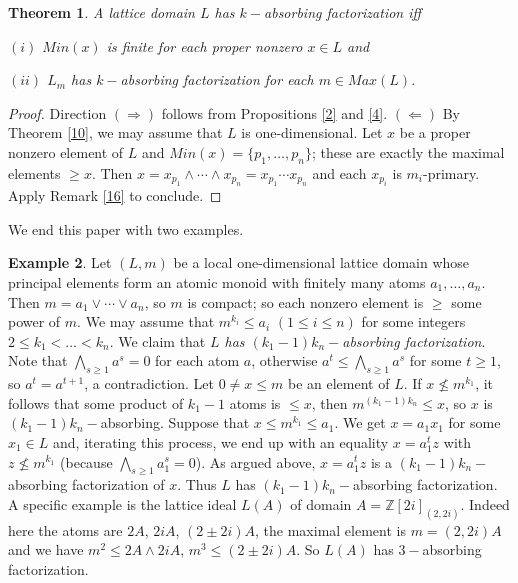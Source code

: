 \documentclass{amsart}
\theoremstyle{plain}
\newtheorem{theorem}{Theorem}%
\theoremstyle{definition}
\newtheorem{example}[theorem]{Example}
\theoremstyle{remark}
\begin{document}
\begin{theorem}\label{17}
A lattice domain $L$ has $k-$absorbing factorization iff 

$(i)$ $Min(x)$ is finite for each proper nonzero $x\in L$ and 

$(ii)$ $L_m$  has $k-$absorbing factorization for each  $m\in Max(L)$.
\end{theorem}
\begin{proof}
Direction $(\Rightarrow) $ follows from Propositions \ref{2} and \ref{4}.
$(\Leftarrow)$ By Theorem \ref{10}, we may assume that $L$ is 
one-dimensional. Let $x$ be a proper nonzero element of $L$ and $Min(x)=\{p_1,\ldots,p_n\}$; these are exactly the maximal elements $\geq x$. Then 
$x= x_{p_1}\wedge \cdots \wedge x_{p_n}
=x_{p_1}  \cdots   x_{p_n}$ and  each $x_{p_i}$ is $m_i$-primary.
Apply Remark \ref{16} to conclude.
\end{proof}

We end this paper with two examples.

\begin{example}  
Let $(L,m)$ be a local one-dimensional lattice domain whose principal elements form an atomic monoid with finitely many atoms $a_1,\ldots , a_n$.
Then $m=a_1\vee\cdots \vee a_n$, so $m$ is compact; so each nonzero element is $\geq$ some power of $m$. We may assume that 
 $m^{k_i}\leq a_i$  $(1\leq i\leq n) $ for some integers $2\leq k_1< \ldots <k_n$.
We claim that {\em $L$ has  $(k_1-1)k_n-$absorbing factorization}. Note that 
$\bigwedge_{s\geq 1} a^s=0$ for each atom $a$, otherwise $a^t\leq \bigwedge_{s\geq 1} a^s$ for some $t\geq 1$, so $a^t=a^{t+1}$, a contradiction. Let $0\neq x\leq m$ be an element of $L$. If $x\not \leq m^{k_1}$, it follows that some product of $k_1-1$ atoms is $\leq x$, 
then $m^{(k_1-1)k_n}\leq  x$, so $x$ is $(k_1-1)k_n-$absorbing. 
Suppose that $x  \leq m^{k_1}\leq a_1$. We get   $x=a_1x_1$ for some $x_1\in L$ and, iterating this process, we end up with an equality 
$x=a_1^tz$ with $z\not\leq m^{k_1}$ (because $\bigwedge_{s\geq 1} a_1^s=0$). As argued above, $x=a_1^tz$ is a $(k_1-1)k_n-$absorbing factorization of $x$. Thus $L$ has $(k_1-1)k_n-$absorbing factorization.
A specific example is the lattice ideal $L(A)$ of domain 
$A=\mathbb{Z}[2i]_{(2,2i)} $. Indeed here the  atoms  are $2A$, $2iA$, 
$(2\pm 2i)A$, the maximal element is $m=(2,2i)A$ and we have $m^2\leq 2A\wedge 2iA$, $m^3\leq (2\pm 2i)A$. So $L(A)$ has $3-$absorbing factorization.
\end{example} 
\end{document}
